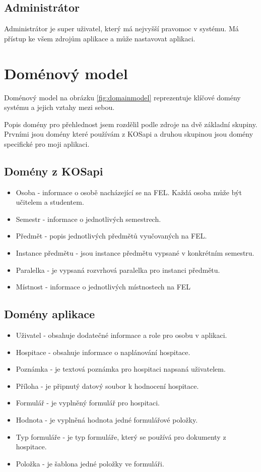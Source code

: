 \subsection{Administrátor}
Administrátor je super uživatel, který má nejvyšší pravomoc v systému. Má přístup ke všem zdrojům aplikace a může nastavovat aplikaci.

\section{Doménový model}
Doménový model na obrázku \ref{fig:domainmodel} reprezentuje klíčové domény systému a jejich vztahy mezi sebou. 

Popis domény pro přehlednost jsem rozdělil podle zdroje na dvě základní skupiny. Prvními jsou domény které používám z KOSapi a druhou skupinou jsou domény specifické pro moji aplikaci. 

\subsection{Domény z KOSapi}
\begin{itemize}
\item Osoba - informace o osobě nacházející se na FEL. Každá osoba může být učitelem a studentem.
\item Semestr - informace o jednotlivých semestrech. 
\item Předmět - popis jednotlivých předmětů vyučovaných na FEL.
\item Instance předmětu - jsou instance předmětu vypsané v konkrétním semestru.
\item Paralelka - je vypsaná rozvrhová paralelka pro instanci předmětu.
\item Místnost - informace o jednotlivých místnostech na FEL
\end{itemize}

\subsection{Domény aplikace}
\begin{itemize}
\item Uživatel - obsahuje dodatečné informace a role pro osobu v aplikaci.
\item Hospitace - obsahuje informace o naplánování hospitace. 
\item Poznámka - je textová poznámka pro hospitaci napsaná uživatelem.
\item Příloha - je připnutý datový soubor k hodnocení hospitace.
\item Formulář - je vyplněný formulář pro hospitaci.
\item Hodnota - je vyplněná hodnota jedné formulářové položky.
\item Typ formuláře - je typ formuláře, který se používá pro dokumenty z hospitace. 
\item Položka - je šablona jedné položky ve formuláři.
\end{itemize}

